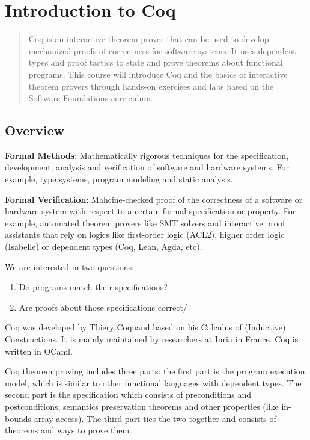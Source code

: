 \section{Introduction to Coq}
\begin{abstract}
	Coq is an interactive theorem prover that can be used to develop mechanized proofs of correctness for software systems. It uses dependent types and proof tactics to state and prove theorems about functional programs. This course will introduce Coq and the basics of interactive theorem provers through hands-on exercises and labs based on the Software Foundations curriculum.
\end{abstract}

\subsection{Overview}
\textbf{Formal Methods}: Mathematically rigorous techniques for the specification, development, analysis and verification
of software and hardware systems. For example, type systems, program modeling and static analysis.

\textbf{Formal Verification}: Mahcine-checked proof of the correctness of a software or hardware system with respect
to a certain formal specification or property. For example, automated theorem provers like SMT solvers and interactive
proof assistants that rely on logics like first-order logic (ACL2), higher order logic (Isabelle) or dependent types (Coq, Lean, Agda, etc).

We are interested in two questions: 
\begin{enumerate}
\item Do programs match their specifications?
\item Are proofs about those specifications correct/
\end{enumerate}

Coq was developed by Thiery Coquand based on his Calculus of (Inductive) Constructions. It is mainly maintained by researchers at Inria in
France. Coq is written in OCaml.

Coq theorem proving includes three parts: the first part is the program execution model, which is similar to other functional languages
with dependent types. The second part is the specification which consists of preconditions and postconditions, semantics preservation theorems
and other properties (like in-bounds array access). The third part ties the two together and consists of theorems and ways to prove them.

